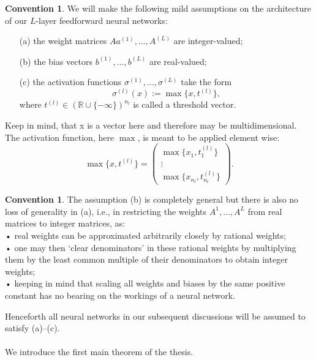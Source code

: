 \documentclass{article}
\theoremstyle{definition}
\newtheorem{convention}[theorem]{Convention}
\begin{document}
\begin{convention}\cite{zhang2018tropical}
We will make the following mild assumptions
on the architecture of our $L$-layer feedforward neural networks:
\begin{itemize}
\item[(a)]
the weight matrices $Aa^{(1)} , \dots , A^{(L)}$ are integer-valued;
\item[(b)]
the bias vectors $b^{(1)} , \dots , b^{(L)}$ are real-valued;
\item[(c)]
the activation functions $\sigma^{(1)} , \dots , \sigma^{(L)}$ take the form
$$\sigma^{(l)}(x) := \max\{x, t^{(l)}\},$$
where $t^{(l)} \in (\mathbb{R} \cup \{-\infty \})^{n_l}$ is called a threshold vector.
\end{itemize}
Keep in mind, that x is a vector here and therefore may be multidimensional. The activation function, here $\max$, is meant to be applied element wise:
$$\max\{x, t^{(l)}\}=\begin{pmatrix}\max\{x_1, t^{(l)}_1 \}\\ \vdots \\ \max\{x_{n_l}, t^{(l)}_{n_l} \}\end{pmatrix}.$$
\end{convention}

\begin{convention}\cite{zhang2018tropical}
The assumption (b) is completely general but there is also no loss of generality in (a), i.e., in restricting the weights $A^{1}, \dots ,A^{L}$
from real matrices to integer matrices, as: \\
• real weights can be approximated arbitrarily closely by
rational weights; \\
• one may then ‘clear denominators’ in these rational
weights by multiplying them by the least common multiple of their denominators to obtain integer weights; \\
• keeping in mind that scaling all weights and biases
by the same positive constant has no bearing on the
workings of a neural network.
\end{convention}

Henceforth all neural networks in our subsequent discussions will be assumed to satisfy (a)–(c). \\ \\
We introduce the first main theorem of the thesis.
\end{document}
